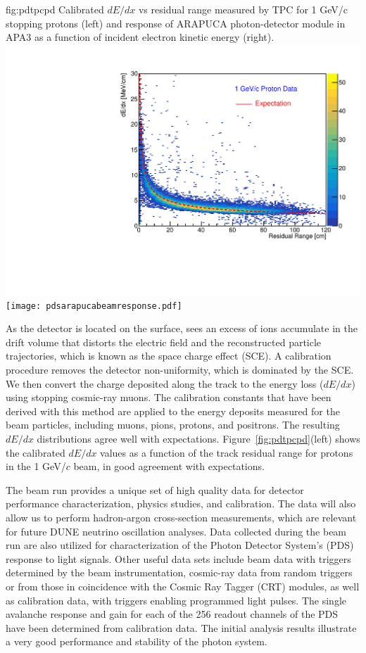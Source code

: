 \begin{dunefigure}
{fig:pdtpcpd}
{Calibrated $dE/dx$ vs residual range measured by TPC for 1 GeV/c stopping protons (left) and response of ARAPUCA photon-detector module in APA3 as a function of incident electron kinetic energy (right).} \includegraphics[width=0.47\linewidth]{graphics/dedx_rr_data_v5.pdf}
\texttt{[image: pdsarapucabeamresponse.pdf]}
\end{dunefigure}

As the detector is located on the surface,  sees an excess of ions accumulate in the drift volume that distorts the electric field and the reconstructed particle trajectories, which is known as the space charge effect (SCE). A calibration procedure removes the detector non-uniformity, which is dominated by the SCE. We then convert the charge deposited along the track to the energy loss ($dE/dx$) using stopping cosmic-ray muons. The calibration constants that have been derived with this method are applied to the energy deposits measured for the beam particles, including muons, pions, protons, and positrons.
The resulting $dE/dx$ distributions agree well with expectations.  Figure~\ref{fig:pdtpcpd}(left) shows the calibrated $dE/dx$ values as a function of the track residual range for protons in the 1 GeV/$c$ beam, in good agreement with expectations. 

The  beam run provides a unique set of high quality data for detector performance characterization, physics studies, and calibration. The data will also
allow us to perform hadron-argon cross-section measurements, which are relevant for future DUNE neutrino oscillation analyses.
Data collected during the beam run are also utilized for characterization of the Photon Detector System's (PDS) response to light signals. Other useful data sets include
beam data with triggers determined by the beam instrumentation, cosmic-ray data  from random triggers or from those in coincidence with the Cosmic Ray Tagger (CRT) modules, as well as calibration data, with triggers enabling programmed light pulses. 
The single avalanche response and gain for each of the 256 readout channels of the PDS have been determined from calibration data.
The initial analysis results illustrate a very good performance and stability of the photon system.


